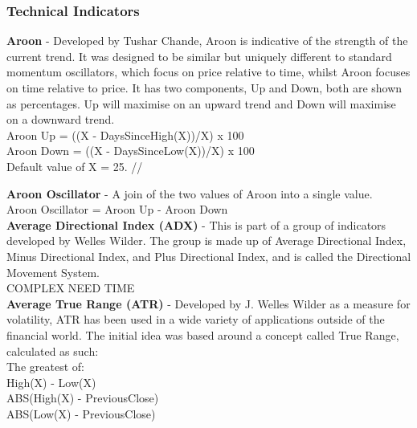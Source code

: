 \documentclass[12pt,a4paper]{article}
\begin{document}
\iffalse
[]
\fi

\iffalse
#################################################################################
\fi

\subsubsection*{Technical Indicators}

\textbf{Aroon} - Developed by Tushar Chande, Aroon is indicative of the strength of the current trend. It was designed to be similar but uniquely different to standard momentum oscillators, which focus on price relative to time, whilst Aroon focuses on time relative to price. It has two components, Up and Down, both are shown as percentages. Up will maximise on an upward trend and Down will maximise on a downward trend.\\

\noindent
Aroon Up = ((X - DaysSinceHigh(X))/X) x 100\\
Aroon Down = ((X - DaysSinceLow(X))/X) x 100\\
Default value of X = 25. //

\iffalse
[]
\fi

\noindent
\textbf{Aroon Oscillator} - A join of the two values of Aroon into a single value.\\

\noindent
Aroon Oscillator = Aroon Up - Aroon Down\\

\iffalse
[]
\fi

\noindent
\textbf{Average Directional Index (ADX)} - This is part of a group of indicators developed by Welles Wilder. The group is made up of Average Directional Index, Minus Directional Index, and Plus Directional Index, and is called the Directional Movement System. \\

COMPLEX NEED TIME \\

\iffalse
[]
\fi

\noindent
\textbf{Average True Range (ATR)} - Developed by J. Welles Wilder as a measure for volatility, ATR has been used in a wide variety of applications outside of the financial world. The initial idea was based around a concept called True Range, calculated as such:\\

\noindent
The greatest of:\\
High(X) - Low(X)\\
ABS(High(X) - PreviousClose)\\
ABS(Low(X) - PreviousClose)\\
\end{document}
